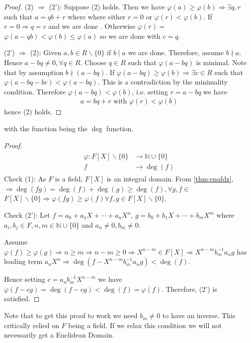 \documentclass{article}
\begin{document}
\begin{proof}
(2)  $\Rightarrow$ (2'):
Suppose (2) holds. Then we have $\varphi(a) \geq \varphi(b) \Rightarrow \exists q, r$ such that $a=q b+r$ where where either $r=0$ or $\varphi(r)<\varphi(b)$. If $r=0 \Rightarrow q=c$ and we are done . Otherwise $\varphi(r)=$ $\varphi(a-q b)<\varphi(b) \leq \varphi(a)$ so we are done with $c=q$.

(2') $\Rightarrow$ (2):
Given $a, b \in R \backslash\{0\}$ if $b \mid a$ we are done. Therefore, assume $b \nmid a$. Hence $a-b q \neq 0, \forall q \in R$. Choose $q \in R$ such that $\varphi(a-b q)$ is minimal. Note that by assumption $b \nmid (a-b q)$. If $\varphi(a-b q) \geq \varphi(b) \Rightarrow \exists c \in R$ such that $\varphi(a-b q-b c)<\varphi(a-b q)$. This is a contradiction by the minimality condition. Therefore $\varphi(a-b q)<\varphi(b)$, i.e. setting $r=a-b q$ we have
\begin{align*}
a=b q+r \text { with } \varphi(r)<\varphi(b)
\end{align*}
hence (2) holds.
\end{proof}
\begin{thma}\label{thm:qdcz}
 with the function being the $\deg$ function.
\end{thma}
\begin{proof}
\begin{align*}
\begin{aligned}
\varphi: F[X] \backslash\{0\} & \longrightarrow \mathbb{N} \cup\{0\} \\
f & \longrightarrow \deg(f)
\end{aligned}
\end{align*}
Check (1): As $F$ is a field, $F[X]$ is an integral domain. From \cref{thm:enafdz}, $\Rightarrow \deg(f g)=\deg(f)+\deg(g) \geq \deg(f), \forall g, f \in$ $F[X] \backslash\{0\} \Rightarrow \varphi(f g) \geq \varphi(f) \forall f, g \in F[X] \backslash\{0\}$.

Check (2'): Let $f=a_{0}+a_{1} X+\cdots+a_{n} X^{n}$, $g=b_{0}+b_{1} X+\cdots+b_{m} X^{m}$ where $a_{i}, b_{j} \in F, n, m \in \mathbb{N} \cup\{0\}$ and $a_{n} \neq 0, b_{m} \neq 0$.

Assume $\varphi(f) \geq \varphi(g) \Rightarrow n \geq m \Rightarrow n-m \geq 0 \Rightarrow X^{n-m} \in F[X] \Rightarrow X^{n-m} b_{m}^{-1} a_{n} g$ has leading term $a_{n} X^{n} \Rightarrow \deg\left(f-X^{n-m} b_{m}^{-1} a_{n} g\right)<\deg(f)$.

Hence setting $c=a_{n} b_{m}^{-1} X^{n-m}$ we have $\varphi(f-c g)=\deg(f-c g)<\deg(f)=\varphi(f)$. Therefore, (2') is satisfied.
\end{proof}
\begin{rema}
 Note that to get this proof to work we need $b_{m} \neq 0$ to have an inverse. This critically relied on $F$ being a field. If we relax this condition we will not necessarily get a Euclidean Domain.
\end{rema}
\end{document}
